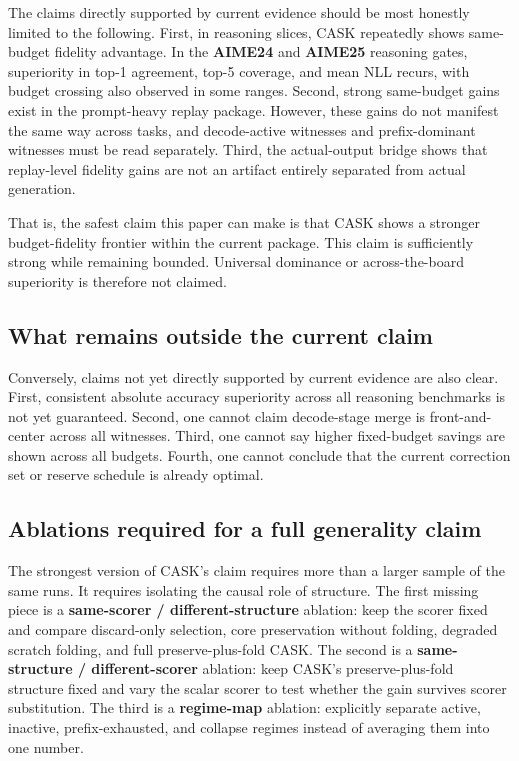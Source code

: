 The claims directly supported by current evidence should be most honestly limited to the following. First, in reasoning slices, CASK repeatedly shows same-budget fidelity advantage. In the \textbf{AIME24} and \textbf{AIME25} reasoning gates, superiority in top-1 agreement, top-5 coverage, and mean NLL recurs, with budget crossing also observed in some ranges. Second, strong same-budget gains exist in the prompt-heavy replay package. However, these gains do not manifest the same way across tasks, and decode-active witnesses and prefix-dominant witnesses must be read separately. Third, the actual-output bridge shows that replay-level fidelity gains are not an artifact entirely separated from actual generation.


That is, the safest claim this paper can make is that CASK shows a stronger budget-fidelity frontier within the current package. This claim is sufficiently strong while remaining bounded. Universal dominance or across-the-board superiority is therefore not claimed.


\subsection{What remains outside the current claim}


Conversely, claims not yet directly supported by current evidence are also clear. First, consistent absolute accuracy superiority across all reasoning benchmarks is not yet guaranteed. Second, one cannot claim decode-stage merge is front-and-center across all witnesses. Third, one cannot say higher fixed-budget savings are shown across all budgets. Fourth, one cannot conclude that the current correction set or reserve schedule is already optimal.


\subsection{Ablations required for a full generality claim}


The strongest version of CASK's claim requires more than a larger sample of the same runs. It requires isolating the causal role of structure. The first missing piece is a \textbf{same-scorer / different-structure} ablation: keep the scorer fixed and compare discard-only selection, core preservation without folding, degraded scratch folding, and full preserve-plus-fold CASK. The second is a \textbf{same-structure / different-scorer} ablation: keep CASK's preserve-plus-fold structure fixed and vary the scalar scorer to test whether the gain survives scorer substitution. The third is a \textbf{regime-map} ablation: explicitly separate active, inactive, prefix-exhausted, and collapse regimes instead of averaging them into one number.


